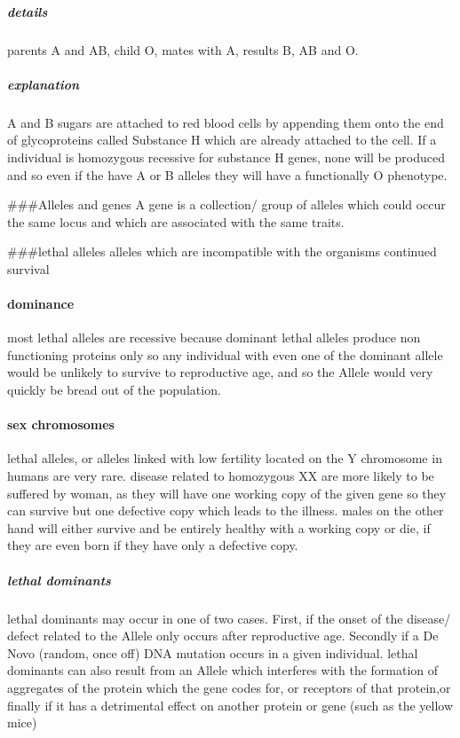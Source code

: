 \documentclass[]{article}
\let\oldparagraph\paragraph
\renewcommand{\paragraph}[1]{\oldparagraph{#1}\mbox{}}
\let\oldsubparagraph\subparagraph
\renewcommand{\subparagraph}[1]{\oldsubparagraph{#1}\mbox{}}
\begin{document}
\hypertarget{details-3}{%
\subparagraph{details}\label{details-3}}

parents A and AB, child O, mates with A, results B, AB and O.

\hypertarget{explanation-2}{%
\subparagraph{explanation}\label{explanation-2}}

A and B sugars are attached to red blood cells by appending them onto
the end of glycoproteins called Substance H which are already attached
to the cell. If a individual is homozygous recessive for substance H
genes, none will be produced and so even if the have A or B alleles they
will have a functionally O phenotype.

\#\#\#Alleles and genes A gene is a collection/ group of alleles which
could occur the same locus and which are associated with the same
traits.

\#\#\#lethal alleles alleles which are incompatible with the organisms
continued survival

\hypertarget{dominance-1}{%
\paragraph{dominance}\label{dominance-1}}

most lethal alleles are recessive because dominant lethal alleles
produce non functioning proteins only so any individual with even one of
the dominant allele would be unlikely to survive to reproductive age,
and so the Allele would very quickly be bread out of the population.

\hypertarget{sex-chromosomes}{%
\paragraph{sex chromosomes}\label{sex-chromosomes}}

lethal alleles, or alleles linked with low fertility located on the Y
chromosome in humans are very rare. disease related to homozygous XX are
more likely to be suffered by woman, as they will have one working copy
of the given gene so they can survive but one defective copy which leads
to the illness. males on the other hand will either survive and be
entirely healthy with a working copy or die, if they are even born if
they have only a defective copy.

\hypertarget{lethal-dominants}{%
\subparagraph{lethal dominants}\label{lethal-dominants}}

lethal dominants may occur in one of two cases. First, if the onset of
the disease/ defect related to the Allele only occurs after reproductive
age. Secondly if a De Novo (random, once off) DNA mutation occurs in a
given individual. lethal dominants can also result from an Allele which
interferes with the formation of aggregates of the protein which the
gene codes for, or receptors of that protein,or finally if it has a
detrimental effect on another protein or gene (such as the yellow mice)
\end{document}
